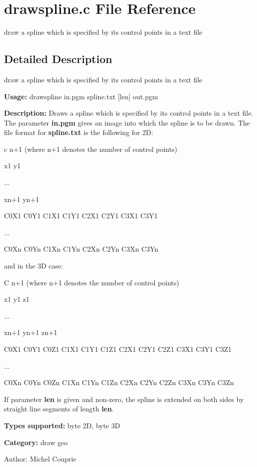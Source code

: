 \section{drawspline.c File Reference}
\label{drawspline_8c}
draw a spline which is specified by its control points in a text file  




\label{_details}
\subsection{Detailed Description}
draw a spline which is specified by its control points in a text file 

{\bf Usage:} drawspline in.pgm spline.txt [len] out.pgm

{\bf Description:} Draws a spline which is specified by its control points in a text file. The parameter {\bf in.pgm} gives an image into which the spline is to be drawn. The file format for {\bf spline.txt} is the following for 2D:

c n+1 (where n+1 denotes the number of control points)\par
 x1 y1\par
 ...\par
 xn+1 yn+1\par
 C0X1 C0Y1 C1X1 C1Y1 C2X1 C2Y1 C3X1 C3Y1\par
 ...\par
 C0Xn C0Yn C1Xn C1Yn C2Xn C2Yn C3Xn C3Yn\par


and in the 3D case:

C n+1 (where n+1 denotes the number of control points)\par
 x1 y1 z1\par
 ...\par
 xn+1 yn+1 zn+1\par
 C0X1 C0Y1 C0Z1 C1X1 C1Y1 C1Z1 C2X1 C2Y1 C2Z1 C3X1 C3Y1 C3Z1\par
 ...\par
 C0Xn C0Yn C0Zn C1Xn C1Yn C1Zn C2Xn C2Yn C2Zn C3Xn C3Yn C3Zn\par


If parameter {\bf len} is given and non-zero, the spline is extended on both sides by straight line segments of length {\bf len}.

{\bf Types supported:} byte 2D, byte 3D

{\bf Category:} draw geo

\begin{Desc}
\item[Author:]Michel Couprie \end{Desc}
